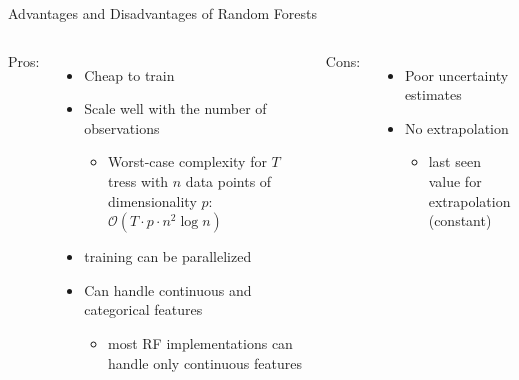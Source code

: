 \begin{frame}[c,fragile]{Advantages and Disadvantages of Random Forests}


\begin{columns}
Pros:
\begin{itemize}
  \item Cheap to train
  \item Scale well with the number of observations
  \begin{itemize}
    \item Worst-case complexity for $T$ tress with $n$ data points of dimensionality $p$: $\mathcal O(T\cdot p \cdot n^2 \log{n})$
  \end{itemize}
  \item training can be parallelized
  \item Can handle continuous and categorical features
  \begin{itemize}
    \item most RF implementations can handle only continuous features
  \end{itemize}
\end{itemize}

Cons:
\begin{itemize}
  \item Poor uncertainty estimates
  \item No extrapolation
  \begin{itemize}
    \item last seen value for extrapolation (constant)
  \end{itemize}
\end{itemize}

\end{columns}

\end{frame}
